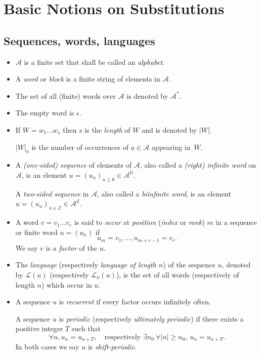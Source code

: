\documentclass[a4paper,11pt]{amsart}
\begin{document}
 \date{today}    

\section{Basic Notions on Substitutions}

\subsection{Sequences, words, languages}\mbox{}

\begin{itemize}
\item $\mathcal{A} $ is a  finite set that shall be called an \emph{alphabet}.

\item A \emph{word} or \emph{block} is a  finite string of elements in
$\mathcal{A} $.  

\item The set of all  (finite) words over $\mathcal{A} $ is denoted by $\mathcal{A}^* $.  

\item The empty word is $\epsilon$.

\item If $W = w_1\dots w_s $ then $s$ is
 the \emph{length} of $W$ and is denoted by $|W|$.  
 
$|W|_a $ is the number of occurrences of   $a  \in \mathcal{ A}$  appearing in~$W$.

\item A  \emph{(one-sided) sequence} of elements of  $\mathcal{A} $,
 also called  a \emph{(right)  infinite word} on  $\mathcal{A} $,
is an element $u = (u_n)_{n\geq 0} \in   \mathcal{A}^\mathbb{N} $. 
 
A \emph{two-sided sequence} in $\mathcal{A} $, 
 also called a \emph{biinfinite word}, is an
element $u = (u_n)_{n\in \mathbb{Z}} \in   \mathcal{A}^\mathbb{Z} $.   
  
\item A word $ v = v_1\dots v_r $ is said to \emph{occur} at \emph{position}  (\emph{index}
 or \emph{rank})  $m$
in a sequence  or finite word $ u = (u_n) $ if 
 \[ 
 u_m = v_1, \dots , u_{m+r-1}=v_r.
 \]
We say $ v $  is a \emph{factor} of the $u $.

\item The \emph{language} (respectively  \emph{language of length $n$})  of the sequence $u$,
denoted by $\mathcal{L}(u)$   (respectively $\mathcal{L}_n(u)$),
 is the set of all words  (respectively of
length $n$)   which occur in $u$.
  
\item A sequence $u$ is \emph{recurrent} if every factor occurs infinitely often. 
   
A sequence $u$ is \emph{periodic}  (respectively \emph{ultimately periodic})  if there exists
a positive integer $T$ such that
   \[
   \forall  n,   u_n = u_{n +T}, \quad   \text{respectively }   \exists n_0 \ \forall |n|\geq n_0, \   u_n = u_{n +T}.
   \] 
In both cases we say $u$ is  \emph{shift-periodic}. 

\end{itemize}
\end{document}
